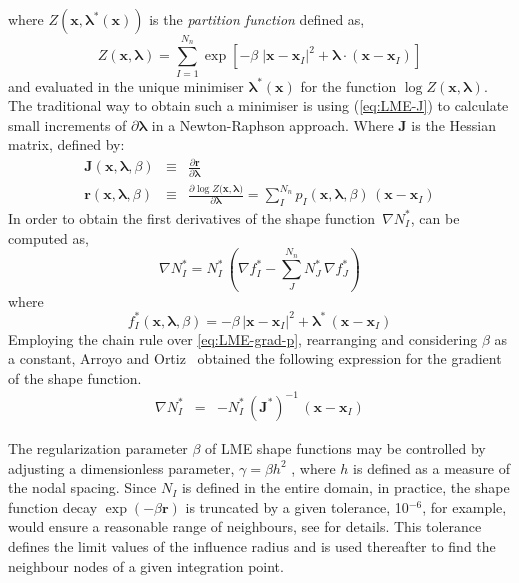 \documentclass[preprint,12pt,a4paper]{elsarticle}
\newcommand{\vec}[1]{
  \ensuremath{\mathbf{{#1}}}
}
\newcommand{\tens}[1]{
  \ensuremath{\mathbf{{#1}}}
}
\begin{document}
where $Z(\vec{x},\vec{\lambda}^*(\vec{x}))$ is the \textit{partition
  function} defined as,
\begin{equation}
  \label{eq:LME-Z}
Z(\vec{x}, {\vec{\lambda}}) = \sum_{I=1}^{N_n}{ \exp \left[ -\beta \; |\vec{x}-\vec{x}_I|^2 + \vec{\lambda} \cdot (\vec{x}-\vec{x}_I)  \right]}
\end{equation}
and evaluated in the unique minimiser $\vec{\lambda}^*(\vec{x})$ for
the function $\log
Z(\vec{x}, \vec{\lambda})$. The traditional way to obtain such a
minimiser is using (\ref{eq:LME-J}) to calculate small increments of $\partial\vec{\lambda}$ in a
Newton-Raphson approach. Where $\tens{J}$ is the Hessian matrix, defined by:
\begin{eqnarray}
  \label{eq:LME-J} 
  \tens{J}(\vec{x}, \vec{\lambda},\beta) &\equiv& \frac{\partial
                                                  \vec{r}}{\partial \vec{\lambda}}\\
  \label{eq:LME-r}
  \vec{r}(\vec{x},\vec{\lambda},\beta) &\equiv& \frac{\partial \log{ Z(   \vec{x},\vec{\lambda}})}{\partial \vec{\lambda}}  = \sum_I^{N_n} p_I(\vec{x},\vec{\lambda},\beta) \, (\vec{x} - \vec{x}_I)
\end{eqnarray}
In order to obtain the first derivatives of the shape function~$\nabla
N^*_I$, can be computed as,
\begin{equation}
  \label{eq:LME-grad-p}
\nabla N^*_I = N^*_I  \, \left(\nabla f^*_I-\sum_J^{N_n} N^*_J \, \nabla f^*_J\right)
\end{equation}
where
\begin{equation}
  \label{eq:LME-f}
f^*_I(\vec{x},  \vec{\lambda},\beta)=-\beta \, |\vec{x}-\vec{x}_I|^2 + \vec{\lambda}^*  \,  (\vec{x}-\vec{x}_I)
\end{equation}
Employing the chain rule over \eqref{eq:LME-grad-p}, rearranging and considering $\beta$ as a
constant, Arroyo and Ortiz~\cite{Arroyo2006} obtained the following
expression for the gradient of the shape function.
\begin{eqnarray}
  \label{eq:LME-gradp} 
\nabla N^*_I &=& -N^*_I \,  (\tens{J}^*)^{-1} \,  (\vec{x} - \vec{x}_I)
\end{eqnarray}

The regularization parameter $\beta$ of LME shape functions may be
controlled by adjusting a dimensionless parameter, $\gamma=\beta h^2$
\cite{Arroyo2006}, where $h$ is defined as a measure of the nodal
spacing. Since  $N_I$ is defined in the entire domain, in practice,
the shape function decay $\exp(-\beta \vec{r} )$ is truncated  by  a
given tolerance, 10$^{-6}$, for example,  would ensure a reasonable range of
neighbours, see \cite{Arroyo2006} for details. This tolerance defines
the limit values of the influence radius and is used thereafter to
find the neighbour nodes of a given integration point.
\end{document}
